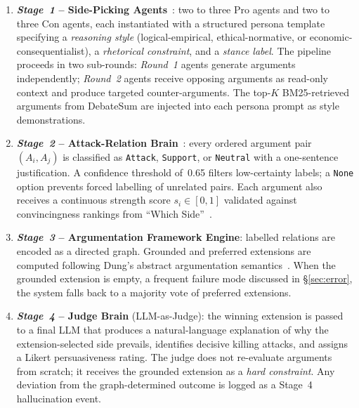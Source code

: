 \documentclass[11pt,twocolumn,letterpaper]{article}
\newcommand{\stage}[1]{\textit{Stage~#1}}
\begin{document}
\begin{enumerate}
  \item \textbf{\stage{1} -- Side-Picking Agents}~\citep{hu2025debate2write}:
        two to three Pro agents and two to three Con agents, each instantiated
        with a structured persona template specifying a \textit{reasoning
        style} (logical-empirical, ethical-normative, or
        economic-consequentialist), a \textit{rhetorical constraint}, and
        a \textit{stance label}.
        The pipeline proceeds in two sub-rounds: \textit{Round~1} agents
        generate arguments independently; \textit{Round~2} agents receive
        opposing arguments as read-only context and produce targeted
        counter-arguments.
        The top-$K$ BM25-retrieved arguments from DebateSum are injected
        into each persona prompt as style demonstrations.

  \item \textbf{\stage{2} -- Attack-Relation Brain}~\citep{ozaki2025llmdebate}:
        every ordered argument pair $(A_i, A_j)$ is classified as
        \texttt{Attack}, \texttt{Support}, or \texttt{Neutral} with a
        one-sentence justification.
        A confidence threshold of~0.65 filters low-certainty labels;
        a \texttt{None} option prevents forced labelling of unrelated pairs.
        Each argument also receives a continuous strength score $s_i\in[0,1]$
        validated against convincingness rankings from ``Which Side''~\citep{li2024whichside}.

  \item \textbf{\stage{3} -- Argumentation Framework Engine}: labelled
        relations are encoded as a directed graph.
        Grounded and preferred extensions are computed following Dung's
        abstract argumentation semantics~\citep{dung1995}.
        When the grounded extension is empty, a frequent failure mode
        discussed in \S\ref{sec:error}, the system falls back to a
        majority vote of preferred extensions.

  \item \textbf{\stage{4} -- Judge Brain} (LLM-as-Judge): the winning
        extension is passed to a final LLM that produces a natural-language
        explanation of why the extension-selected side prevails, identifies
        decisive killing attacks, and assigns a Likert persuasiveness rating.
        The judge does not re-evaluate arguments from scratch; it receives
        the grounded extension as a \emph{hard constraint}.
        Any deviation from the graph-determined outcome is logged as a
        Stage~4 hallucination event.
\end{enumerate}
\end{document}
